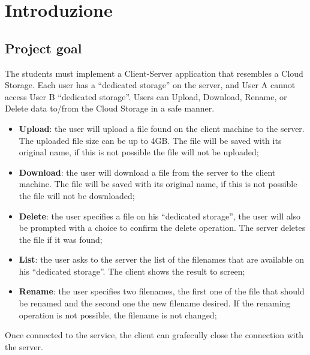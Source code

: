 
\chapter{Introduzione}
\label{cap:introduzione}

\section{Project goal}

The students must implement a Client-Server application that resembles a Cloud Storage. Each user has a  ``dedicated storage'' on the server, and User A cannot access User B ``dedicated storage''. Users can Upload, Download, Rename, or Delete data to/from the Cloud Storage in a safe manner.
\begin{itemize}
	\item \textbf{Upload}: the user will upload a file found on the client machine to the server. The uploaded file size can be up to 4GB. The file will be saved with its original name, if this is not possible the file will not be uploaded;
	\item \textbf{Download}: the user will download a file from the server to the client machine. The file will be saved with its original name, if this is not possible the file will not be downloaded; 
	\item \textbf{Delete}: the user specifies a file on his ``dedicated storage'', the user will also be prompted with a choice to confirm the delete operation. The server deletes the file if it was found; 
	\item \textbf{List}: the user asks to the server the list of the filenames that are available on his ``dedicated storage''. The client shows the result to screen;
	\item \textbf{Rename}: the user specifies two filenames, the first one of the file that should be renamed and the second one the new filename desired. If the renaming operation is not possible, the filename is not changed;
\end{itemize}

Once connected to the service, the client can grafecully close the connection with the server.
\newpage{}

